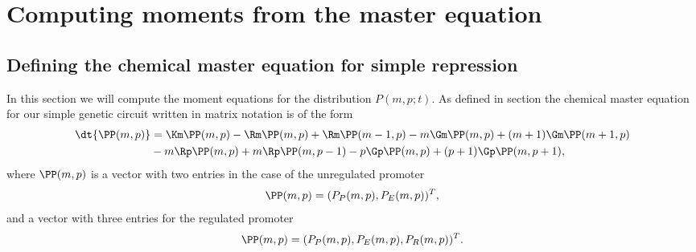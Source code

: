 \section{Computing moments from the master equation}\label{supp_moments}

\subsection{Defining the chemical master equation for simple repression}

In this section we will compute the moment equations for the distribution  $P(m,
p; t)$. As defined in section  the chemical master
equation for our simple genetic circuit written in matrix notation is of the
form
\begin{equation}
  \begin{aligned}
    \dt{\PP(m, p)} &= \Km \PP(m, p)
    - \Rm \PP(m, p) + \Rm \PP(m-1, p)
    - m \Gm \PP(m, p) + (m + 1) \Gm \PP(m + 1, p)\\
    &- m \Rp \PP(m, p) + m \Rp \PP(m, p - 1)
    - p \Gp \PP(m, p) + (p + 1) \Gp \PP(m, p + 1),
  \end{aligned}
  \label{eq_cme_matrix}
\end{equation}
where $\PP(m, p)$ is a vector with two entries in the case of the unregulated
promoter
\begin{equation}
  \PP(m, p) = (P_P(m, p), P_E(m, p))^T,
\end{equation}
and a vector with three entries for the regulated promoter
\begin{equation}
  \PP(m, p) = (P_P(m, p), P_E(m, p), P_R(m, p))^T.
\end{equation}

